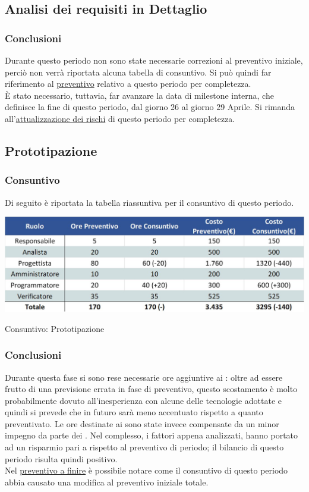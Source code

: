 \subsection{Analisi dei requisiti in Dettaglio}
\subsubsection{Conclusioni}
Durante questo periodo non sono state necessarie correzioni al preventivo iniziale, perciò non verrà riportata alcuna tabella di consuntivo. Si può quindi far riferimento al \hyperref[PreventivoAnalisiRequisitiDettaglio]{preventivo} relativo a questo periodo per completezza. \\
È stato necessario, tuttavia, far avanzare la data di milestone interna, che definisce la fine di questo periodo, dal giorno 26 al giorno 29 Aprile. Si rimanda all'\hyperref[RiscontroAnalisiDettaglio]{attualizzazione dei rischi} di questo periodo per completezza.

\newpage
\subsection{Prototipazione}
\subsubsection{Consuntivo}
Di seguito è riportata la tabella riassuntiva per il consuntivo di questo periodo.
\begin{table}[h!]
	\centerline{\includegraphics[scale=0.55]{img/Preventivo/Consuntivo/PrototipazioneConsuntivo.jpg}}
	\caption{Consuntivo: Prototipazione}
\end{table}

\subsubsection{Conclusioni}
Durante questa fase si sono rese necessarie ore aggiuntive ai \progrs{}: oltre ad essere frutto di una previsione errata in fase di preventivo, questo scostamento è molto probabilmente dovuto all'inesperienza con alcune delle tecnologie adottate e quindi si prevede che in futuro sarà meno accentuato rispetto a quanto preventivato. Le ore destinate ai \progrs{} sono state invece compensate da un minor impegno da parte dei \progs{}. Nel complesso, i fattori appena analizzati, hanno portato ad un risparmio pari a  rispetto al preventivo di periodo; il bilancio di questo periodo risulta quindi positivo. \\ 
Nel \hyperref[PreventivoFinire]{preventivo a finire} è possibile notare come il consuntivo di questo periodo abbia causato una modifica al preventivo iniziale totale.
